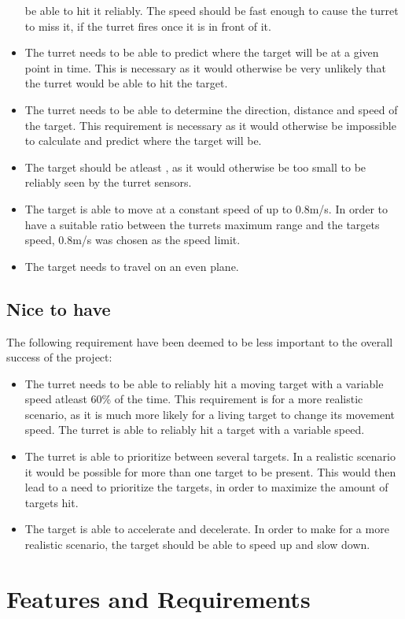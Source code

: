 \begin{itemize}
  be able to hit it reliably. The speed should be fast enough to cause the
  turret to miss it, if the turret fires once it is in front of it.
  \item The turret needs to be able to predict where the target will be at a given point
in time. This is necessary as it would otherwise be very unlikely that the
turret would be able to hit the target.
  \item The turret needs to be able to determine the direction, distance
  and speed of the target. This requirement is necessary as it would otherwise be impossible to
calculate and predict where the target will be.
  \item The target should be atleast , as it
would otherwise be too small to be reliably seen by the turret sensors.
  \item The target is able to move at a constant speed of up to 0.8m/s. In order to
have a suitable ratio between the turrets maximum range and the targets
speed, 0.8m/s was chosen as the speed limit.
  \item The target needs to travel on an even plane.
\end{itemize}

\subsection{Nice to have}
The following requirement have been deemed to be less important to the overall
success of the project:
\begin{itemize}
  \item The turret needs to be able to reliably hit a moving target with a
variable speed atleast 60\% of the time. This requirement is for a
more realistic scenario, as it is much more likely for a living target to
change its movement speed. The turret is able to reliably hit a target with a
variable speed.
  \item The turret is able to prioritize between several targets. In a realistic
scenario it would be possible for more than one target to be present. This would
then lead to a need to prioritize the targets, in order to maximize the
amount of targets hit.
  \item The target is able to accelerate and decelerate. In order to make for a
  more realistic scenario, the target should be able to speed up and slow down.
\end{itemize}

\section{Features and Requirements}

